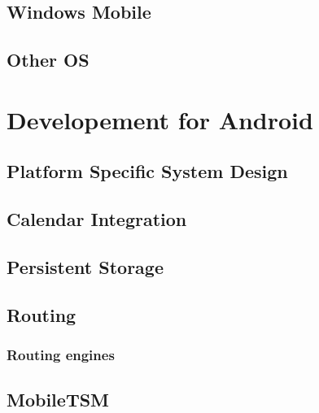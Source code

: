 \documentclass[11pt,a4paper]{scrreprt}
\begin{document}
\section{Windows Mobile} %
\label{sec:win_mobile}


\section{Other OS} %
\label{sec:other_os}


\chapter{Developement for Android} %
\label{chp:android}
%

\section{Platform Specific System Design} %
\label{sec:android_desing}


\section{Calendar Integration} %
\label{sec:android_calendar}


\section{Persistent Storage} %
\label{sec:android_pers_storage}


\section{Routing} %
\label{sec:android_routing}


\subsection{Routing engines}
\label{sub:routing_engines}


\section{MobileTSM} %
\label{sub:routing_mobiletsm}

\end{document}
